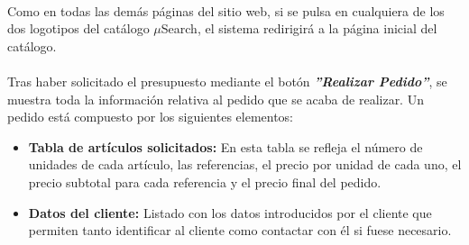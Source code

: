 \paragraph{}Como en todas las demás páginas del sitio web, si se pulsa en cualquiera de los dos logotipos del catálogo $\mu$Search, el sistema redirigirá a la página inicial del catálogo.

\paragraph{}Tras haber solicitado el presupuesto mediante el botón \textit{\textbf{''Realizar Pedido''}}, se muestra toda la información relativa al pedido
que se acaba de realizar. Un pedido está compuesto por los siguientes elementos:

\begin{itemize}
	\item \textbf{Tabla de artículos solicitados:} En esta tabla se refleja el número de unidades de cada artículo, las referencias, el precio por unidad de cada uno, el precio subtotal para cada referencia y el precio final del pedido.
	
	\item \textbf{Datos del cliente:} Listado con los datos introducidos por el cliente que permiten tanto identificar al cliente como contactar con él si fuese necesario.
\end{itemize}